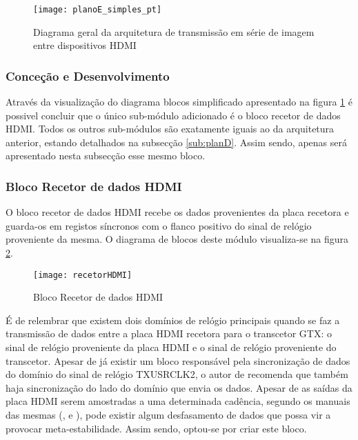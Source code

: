 \begin{figure}[h!]
	\begin{center}
		\leavevmode
		\texttt{[image: planoE\_simples\_pt]}
		\captionsetup{width=1.0\linewidth}
		\caption[Diagrama geral da arquitetura de transmissão em série de imagem entre dispositivos HDMI]{Diagrama geral da arquitetura de transmissão em série de imagem entre dispositivos HDMI}
		\label{fig:planE_simples}
	\end{center}
\end{figure}


\subsubsection{Conceção e Desenvolvimento}

Através da visualização do diagrama blocos simplificado apresentado na figura \ref{fig:planE_simples} é possivel concluir que o único sub-módulo adicionado é o bloco recetor de dados HDMI. Todos os outros sub-módulos são exatamente iguais ao da arquitetura anterior, estando detalhados na subsecção \ref{sub:planD}. Assim sendo, apenas será apresentado nesta subsecção esse mesmo bloco.

\subsubsection*{Bloco Recetor de dados HDMI}
O bloco recetor de dados HDMI recebe os dados provenientes da placa recetora e guarda-os em registos síncronos com o flanco positivo do sinal de relógio proveniente da mesma. O diagrama de blocos deste módulo visualiza-se na figura \ref{fig:recetorHDMI}.
\begin{figure}[h!]
	\begin{center}
		\leavevmode
		\texttt{[image: recetorHDMI]}
		\captionsetup{width=1.0\linewidth}
		\caption[Bloco recetor de dados HDMI]{Bloco Recetor de dados HDMI}
		\label{fig:recetorHDMI}
	\end{center}
\end{figure}

É de relembrar que existem dois domínios de relógio principais quando se faz a transmissão de dados entre a placa HDMI recetora para o transcetor GTX: o sinal de relógio proveniente da placa HDMI e o sinal de relógio proveniente do transcetor. Apesar de já existir um bloco responsável pela sincronização de dados do domínio do sinal de relógio TXUSRCLK2, o autor de \cite{R024} recomenda que também haja sincronização do lado do domínio que envia os dados. Apesar de as saídas da placa HDMI serem amostradas a uma determinada cadência, segundo os manuais das mesmas (\cite{R009}, \cite{R014} e \cite{R013}), pode existir algum desfasamento de dados que possa vir a provocar meta-estabilidade. Assim sendo, optou-se por criar este bloco.

